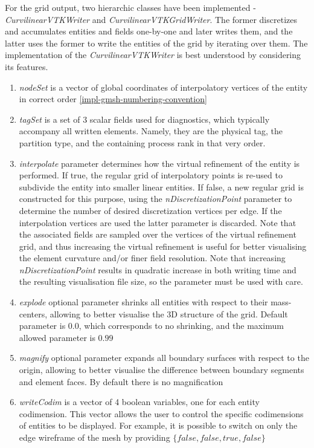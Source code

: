 
For the grid output, two hierarchic classes have been implemented - \textit{CurvilinearVTKWriter} and \textit{CurvilinearVTKGridWriter}. The former discretizes and accumulates entities and fields one-by-one and later writes them, and the latter uses the former to write the entities of the grid by iterating over them. The implementation of the \textit{CurvilinearVTKWriter} is best understood by considering its features.


\begin{enumerate}  
  \item \textit{nodeSet} is a vector of global coordinates of interpolatory vertices of the entity in correct order \ref{impl-gmsh-numbering-convention}
  \item \textit{tagSet} is a set of 3 scalar fields used for diagnostics, which typically accompany all written elements. Namely, they are the physical tag, the partition type, and the containing process rank in that very order. 
  \item \textit{interpolate} parameter determines how the virtual refinement of the entity is performed. If true, the regular grid of interpolatory points is re-used to subdivide the entity into smaller linear entities. If false, a new regular grid is constructed for this purpose, using the \textit{nDiscretizationPoint} parameter to determine the number of desired discretization vertices per edge. If the interpolation vertices are used the latter parameter is discarded. Note that the associated fields are sampled over the vertices of the virtual refinement grid, and thus increasing the virtual refinement is useful for better visualising the element curvature and/or finer field resolution. Note that increasing \textit{nDiscretizationPoint} results in quadratic increase in both writing time and the resulting visualisation file size, so the parameter must be used with care.
  \item \textit{explode} optional parameter shrinks all entities with respect to their mass-centers, allowing to better visualise the 3D structure of the grid. Default parameter is $0.0$, which corresponds to no shrinking, and the maximum allowed parameter is $0.99$
  \item \textit{magnify} optional parameter expands all boundary surfaces with respect to the origin, allowing to better visualise the difference between boundary segments and element faces. By default there is no magnification  
  \item \textit{writeCodim} is a vector of 4 boolean variables, one for each entity codimension. This vector allows the user to control the specific codimensions of entities to be displayed. For example, it is possible to switch on only the edge wireframe of the mesh by providing $\{ false, false, true, false \}$
\end{enumerate}


